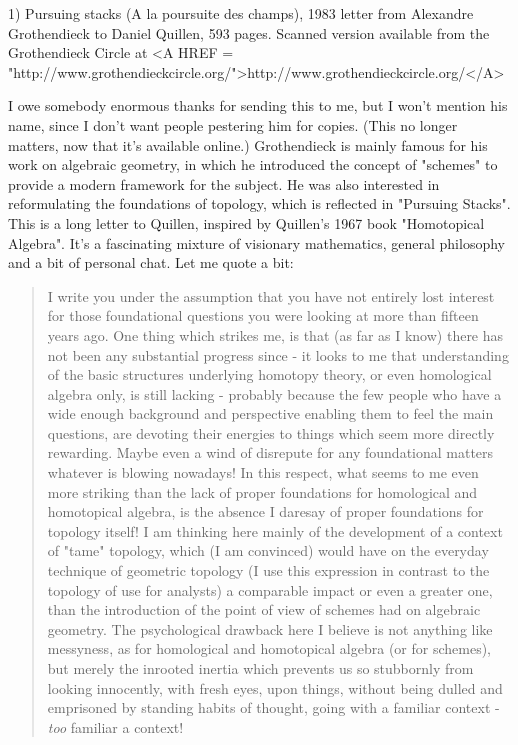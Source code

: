 

1) Pursuing stacks (A la poursuite des champs), 1983 letter from Alexandre
Grothendieck to Daniel Quillen, 593 pages.  Scanned version available
from the Grothendieck Circle at <A HREF = "http://www.grothendieckcircle.org/">http://www.grothendieckcircle.org/</A>

I owe somebody enormous thanks for sending this to me, but I won't
mention his name, since I don't want people pestering him for copies.
(This no longer matters, now that it's available online.)
Grothendieck is mainly famous for his work on algebraic geometry, in
which he introduced the concept of "schemes" to provide a modern
framework for the subject.  He was also interested in reformulating the
foundations of topology, which is reflected in "Pursuing Stacks".  
This
is a long letter to Quillen, inspired by Quillen's 1967 book
"Homotopical Algebra".  It's a fascinating mixture of visionary
mathematics, general philosophy and a bit of personal chat.  Let me
quote a bit:

\begin{quote}
I write you under the assumption that you have not entirely lost
interest for those foundational questions you were looking at more than
fifteen years ago.  One thing which strikes me, is that (as far as I
know) there has not been any substantial progress since - it looks to me
that understanding of the basic structures underlying homotopy theory,
or even homological algebra only, is still lacking - probably because
the few people who have a wide enough background and perspective
enabling them to feel the main questions, are devoting their energies to
things which seem more directly rewarding. Maybe even a wind of
disrepute for any foundational matters whatever is blowing nowadays!  In
this respect, what seems to me even more striking than the lack of
proper foundations for homological and homotopical algebra, is the
absence I daresay of proper foundations for topology itself!  I am
thinking here mainly of the development of a context of "tame" topology,
which (I am convinced) would have on the everyday technique of geometric
topology (I use this expression in contrast to the topology of use for
analysts) a comparable impact or even a greater one, than the
introduction of the point of view of schemes had on algebraic geometry.
The psychological drawback here I believe is not anything like
messyness, as for homological and homotopical algebra (or for schemes),
but merely the inrooted inertia which prevents us so stubbornly from
looking innocently, with fresh eyes, upon things, without being dulled
and emprisoned by standing habits of thought, going with a familiar
context - \emph{too} familiar a context!\end{quote}


